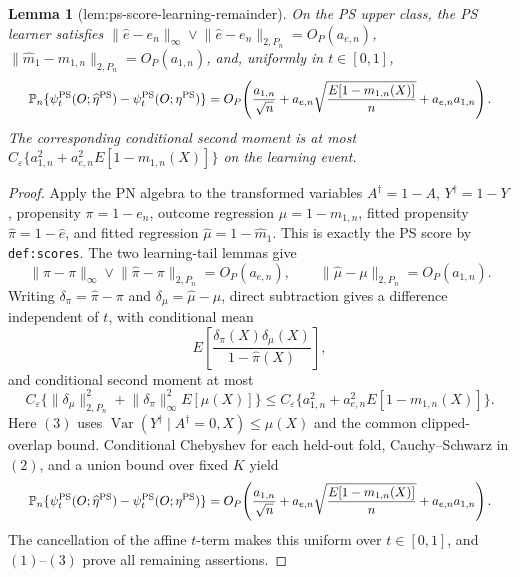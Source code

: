 \documentclass{article}
\newtheorem{lemma}{Lemma}
\begin{document}
\begin{lemma}[lem:ps-score-learning-remainder]\label{lem:ps-score-learning-remainder}
On the PS upper class, the PS learner satisfies \(\lVert\widehat e-e_n\rVert_\infty\vee\lVert\widehat e-e_n\rVert_{2,P_n}=O_P(a_{e,n})\), \(\lVert\widehat m_1-m_{1,n}\rVert_{2,P_n}=O_P(a_{1,n})\), and, uniformly in \(t\in[0,1]\),
\[
\makebox[\linewidth][c]{\resizebox{0.98\linewidth}{!}{\par\noindent \makebox[\linewidth][c]{\resizebox{0.98\linewidth}{!}{\(\displaystyle \displaystyle \mathbb P_n\{\psi_t^{\mathrm{PS}}(O;\widehat\eta^{\mathrm{PS}})-\psi_t^{\mathrm{PS}}(O;\eta^{\mathrm{PS}})\}=O_P\!\left(\frac{a_{1,n}}{\sqrt n}+a_{e,n}\sqrt{\frac{E[1-m_{1,n}(X)]}{n}}+a_{e,n}a_{1,n}\right).\)}}\par\noindent}}
\]
The corresponding conditional second moment is at most \(C_\varepsilon\{a_{1,n}^2+a_{e,n}^2E[1-m_{1,n}(X)]\}\) on the learning event.
\end{lemma}
\begin{proof}
Apply the PN algebra to the transformed variables \(A^\dagger=1-A\), \(Y^\dagger=1-Y\), propensity \(\pi=1-e_n\), outcome regression \(\mu=1-m_{1,n}\), fitted propensity \(\widehat\pi=1-\widehat e\), and fitted regression \(\widehat\mu=1-\widehat m_1\). This is exactly the PS score by \texttt{def:scores}. The two learning-tail lemmas give
\[\lVert\widehat\pi-\pi\rVert_\infty\vee\lVert\widehat\pi-\pi\rVert_{2,P_n}=O_P(a_{e,n}),\qquad \lVert\widehat\mu-\mu\rVert_{2,P_n}=O_P(a_{1,n}).\tag{1}\]
Writing \(\delta_\pi=\widehat\pi-\pi\) and \(\delta_\mu=\widehat\mu-\mu\), direct subtraction gives a difference independent of \(t\), with conditional mean
\[E\!\left[\frac{\delta_\pi(X)\delta_\mu(X)}{1-\widehat\pi(X)}\right],\tag{2}\]
and conditional second moment at most
\[C_\varepsilon\{\lVert\delta_\mu\rVert_{2,P_n}^2+\lVert\delta_\pi\rVert_\infty^2E[\mu(X)]\}\le C_\varepsilon\{a_{1,n}^2+a_{e,n}^2E[1-m_{1,n}(X)]\}.\tag{3}\]
Here \((3)\) uses \(\operatorname{Var}(Y^\dagger\mid A^\dagger=0,X)\le\mu(X)\) and the common clipped-overlap bound. Conditional Chebyshev for each held-out fold, Cauchy--Schwarz in \((2)\), and a union bound over fixed \(K\) yield
\[
\makebox[\linewidth][c]{\resizebox{0.98\linewidth}{!}{\par\noindent \makebox[\linewidth][c]{\resizebox{0.98\linewidth}{!}{\(\displaystyle \displaystyle \mathbb P_n\{\psi_t^{\mathrm{PS}}(O;\widehat\eta^{\mathrm{PS}})-\psi_t^{\mathrm{PS}}(O;\eta^{\mathrm{PS}})\}=O_P\!\left(\frac{a_{1,n}}{\sqrt n}+a_{e,n}\sqrt{\frac{E[1-m_{1,n}(X)]}{n}}+a_{e,n}a_{1,n}\right).\)}}\par\noindent}}
\]
The cancellation of the affine \(t\)-term makes this uniform over \(t\in[0,1]\), and \((1)\)--\((3)\) prove all remaining assertions.
\end{proof}
\end{document}
